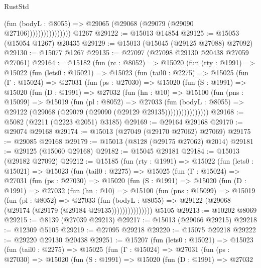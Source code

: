 \begin{lexlean}{RustStd}
\begin{coremodule}
                            (fun (bodyL : @8055) =>
                            @29065 (@29068 (@29079 (@29090 @27106))))))))))))))))
    @1267
@29122 := @15013 @14854
@29125 := @15053 (@15054 @1267) @20435
@29129 := @15013 (@15045 (@29125 @27088) @27092)
@29130 := @15077 @1267
@29135 := @27097 (@27098 @29130 @20438 @27059 @27061)
@29164 := @15182
    (fun (rc : @8052) =>
    @15020
      (fun (rty : @1991) =>
      @15022
        (fun (lets0 : @15021) =>
        @15023
          (fun (tail0 : @2275) =>
          @15025
            (fun (Γ : @15024) =>
            @27031
              (fun (ps : @27030) =>
              @15020
                (fun (S : @1991) =>
                @15020
                  (fun (D : @1991) =>
                  @27032
                    (fun (hn : @10) =>
                    @15100
                      (fun (pns : @15099) =>
                      @15019
                        (fun (pl : @8052) =>
                        @27033
                          (fun (bodyL : @8055) =>
                          @29122 (@29068 (@29079 (@29090 (@29129 @29135))))))))))))))))
@29168 := @5082 (@2211 (@2223 @2051) @3185)
@29169 := @29164 @29168
@29170 := @29074 @29168
@29174 := @15013 (@27049 (@29170 @27062) @27069)
@29175 := @29085 @29168
@29179 := @15013 (@8128 (@29175 @27062) @2014)
@29181 := @29125 (@15060 @29168)
@29182 := @15045 @29181
@29184 := @15013 (@29182 @27092)
@29212 := @15185
    (fun (rty : @1991) =>
    @15022
      (fun (lets0 : @15021) =>
      @15023
        (fun (tail0 : @2275) =>
        @15025
          (fun (Γ : @15024) =>
          @27031
            (fun (ps : @27030) =>
            @15020
              (fun (S : @1991) =>
              @15020
                (fun (D : @1991) =>
                @27032
                  (fun (hn : @10) =>
                  @15100
                    (fun (pns : @15099) =>
                    @15019
                      (fun (pl : @8052) =>
                      @27033
                        (fun (bodyL : @8055) =>
                        @29122 (@29068 (@29174 (@29179 (@29184 @29135)))))))))))))))
    @5105
@29213 := @10202 @8069
@29215 := @8139 (@27039 @29213)
@29217 := @15013 (@29066 @29215)
@29218 := @12309 @5105
@29219 := @27095 @29218
@29220 := @15075 @29218
@29222 := @29220 @29130 @20438
@29251 := @15207
    (fun (lets0 : @15021) =>
    @15023
      (fun (tail0 : @2275) =>
      @15025
        (fun (Γ : @15024) =>
        @27031
          (fun (ps : @27030) =>
          @15020
            (fun (S : @1991) =>
            @15020
              (fun (D : @1991) =>
              @27032

\end{coremodule}
\end{lexlean}
